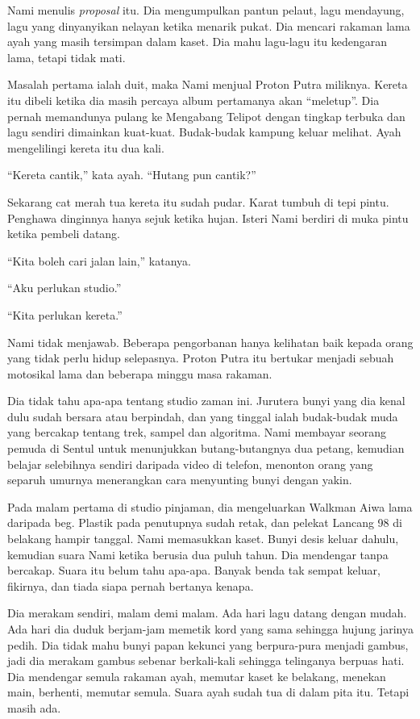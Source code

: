 \documentclass[
  11pt,
  a5paper,
  openany,
  oneside]{book}
\begin{document}
Nami menulis \emph{proposal} itu. Dia mengumpulkan pantun pelaut, lagu
mendayung, lagu yang dinyanyikan nelayan ketika menarik pukat. Dia
mencari rakaman lama ayah yang masih tersimpan dalam kaset. Dia mahu
lagu-lagu itu kedengaran lama, tetapi tidak mati.

Masalah pertama ialah duit, maka Nami menjual Proton Putra miliknya.
Kereta itu dibeli ketika dia masih percaya album pertamanya akan
``meletup''. Dia pernah memandunya pulang ke Mengabang Telipot dengan
tingkap terbuka dan lagu sendiri dimainkan kuat-kuat. Budak-budak
kampung keluar melihat. Ayah mengelilingi kereta itu dua kali.

``Kereta cantik,'' kata ayah. ``Hutang pun cantik?''

Sekarang cat merah tua kereta itu sudah pudar. Karat tumbuh di tepi
pintu. Penghawa dinginnya hanya sejuk ketika hujan. Isteri Nami berdiri
di muka pintu ketika pembeli datang.

``Kita boleh cari jalan lain,'' katanya.

``Aku perlukan studio.''

``Kita perlukan kereta.''

Nami tidak menjawab. Beberapa pengorbanan hanya kelihatan baik kepada
orang yang tidak perlu hidup selepasnya. Proton Putra itu bertukar
menjadi sebuah motosikal lama dan beberapa minggu masa rakaman.

Dia tidak tahu apa-apa tentang studio zaman ini. Jurutera bunyi yang dia
kenal dulu sudah bersara atau berpindah, dan yang tinggal ialah
budak-budak muda yang bercakap tentang trek, sampel dan algoritma. Nami
membayar seorang pemuda di Sentul untuk menunjukkan butang-butangnya dua
petang, kemudian belajar selebihnya sendiri daripada video di telefon,
menonton orang yang separuh umurnya menerangkan cara menyunting bunyi
dengan yakin.

Pada malam pertama di studio pinjaman, dia mengeluarkan Walkman Aiwa
lama daripada beg. Plastik pada penutupnya sudah retak, dan pelekat
Lancang 98 di belakang hampir tanggal. Nami memasukkan kaset. Bunyi
desis keluar dahulu, kemudian suara Nami ketika berusia dua puluh tahun.
Dia mendengar tanpa bercakap. Suara itu belum tahu apa-apa. Banyak benda
tak sempat keluar, fikirnya, dan tiada siapa pernah bertanya kenapa.

Dia merakam sendiri, malam demi malam. Ada hari lagu datang dengan
mudah. Ada hari dia duduk berjam-jam memetik kord yang sama sehingga
hujung jarinya pedih. Dia tidak mahu bunyi papan kekunci yang
berpura-pura menjadi gambus, jadi dia merakam gambus sebenar
berkali-kali sehingga telinganya berpuas hati. Dia mendengar semula
rakaman ayah, memutar kaset ke belakang, menekan main, berhenti, memutar
semula. Suara ayah sudah tua di dalam pita itu. Tetapi masih ada.
\end{document}
